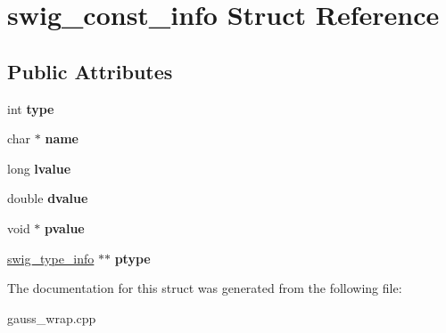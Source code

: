 \hypertarget{structswig__const__info}{\section{swig\-\_\-const\-\_\-info Struct Reference}
\label{structswig__const__info}
}
\subsection*{Public Attributes}
\begin{DoxyCompactItemize}
\item 
\hypertarget{structswig__const__info_ae8bbc99e1cda11f24e306365cbf33893}{int {\bfseries type}}\label{structswig__const__info_ae8bbc99e1cda11f24e306365cbf33893}

\item 
\hypertarget{structswig__const__info_aad383d74116313cf9a8532e163368050}{char $\ast$ {\bfseries name}}\label{structswig__const__info_aad383d74116313cf9a8532e163368050}

\item 
\hypertarget{structswig__const__info_af142e4c21ad4fe61f6c2624bff034583}{long {\bfseries lvalue}}\label{structswig__const__info_af142e4c21ad4fe61f6c2624bff034583}

\item 
\hypertarget{structswig__const__info_a74e477f1dbf515bcb7e2ef07a1d34c35}{double {\bfseries dvalue}}\label{structswig__const__info_a74e477f1dbf515bcb7e2ef07a1d34c35}

\item 
\hypertarget{structswig__const__info_abbc43512c364bff11fac5961c1155090}{void $\ast$ {\bfseries pvalue}}\label{structswig__const__info_abbc43512c364bff11fac5961c1155090}

\item 
\hypertarget{structswig__const__info_aedd46d173c5b5ed4ee60ad5660233557}{\hyperlink{structswig__type__info}{swig\-\_\-type\-\_\-info} $\ast$$\ast$ {\bfseries ptype}}\label{structswig__const__info_aedd46d173c5b5ed4ee60ad5660233557}

\end{DoxyCompactItemize}


The documentation for this struct was generated from the following file\-:\begin{DoxyCompactItemize}
\item 
gauss\-\_\-wrap.\-cpp\end{DoxyCompactItemize}
